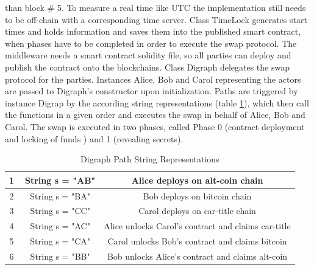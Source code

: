 than block \# 5. To measure a real time like \ac{UTC} the implementation still needs to be off-chain with a corresponding time server. Class TimeLock generates start times and holds information and saves them into the published smart contract, when phases have to be completed in order to execute the swap protocol. The middleware needs a smart contract solidity file, so all parties can deploy and publish the contract onto the blockchains. Class Digraph delegates the swap protocol for the parties. Instances Alice, Bob and Carol representing the actors are passed to Digraph's constructor upon initialization. Paths are triggered by instance Digrap by the according string representations (table \ref{table:2}), which then call the functions in a given order and executes the swap in behalf of Alice, Bob and Carol. The swap is executed in two phases, called Phase 0 (contract deployment and locking of funds ) and 1 (revealing secrets).




\begin{table}[h!]
	\centering
	\begin{tabular}{|c | c | c |} 
		\hline 
		\textcircled{1} & String s = "AB" & Alice deploys on alt-coin chain\\ [0.5ex] 
		\hline
		\textcircled{2} & String s = "BA" & Bob deploys on bitcoin chain\\ 
		\hline
		\textcircled{3} & String s = "CC" & Carol deploys on car-title chain \\
		\hline
		\textcircled{4} & String s = "AC" & Alice unlocks Carol's contract and claims car-title \\ [1ex] 
		\hline
		\textcircled{5} & String s = "CA" & Carol unlocks Bob's contract and claims bitcoin \\ [1ex] 
		\hline
		\textcircled{6} & String s = "BB" & Bob unlocks Alice's contract and claims alt-coin \\ [1ex] 
		\hline
	\end{tabular}
	\caption{Digraph Path String Representations}
	\label{table:2}
\end{table}

